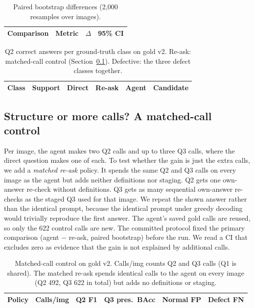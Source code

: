\documentclass[11pt]{article}
\begin{document}
\begin{table}[t]
\centering
\caption{Paired bootstrap differences (2,000 resamples over images).}
\label{tab:ci}
\begin{tabular}{llrr}
\toprule
Comparison & Metric & $\Delta$ & 95\% CI \\
\midrule

\bottomrule
\end{tabular}
\end{table}

\begin{table}[t]
\centering
\caption{Q2 correct answers per ground-truth class on gold v2. Re-ask: matched-call control (Section~\ref{sec:matched}). Defective: the three defect classes together.}
\label{tab:perdefect}
\begin{tabular}{lrrrrr}
\toprule
Class & Support & Direct & Re-ask & Agent & Candidate \\
\midrule

\bottomrule
\end{tabular}
\end{table}

\subsection{Structure or more calls? A matched-call control}\label{sec:matched}
Per image, the agent makes two Q2 calls and up to three Q3 calls, where the direct question makes one of each. To test whether the gain is just the extra calls, we add a \emph{matched re-ask} policy. It spends the same Q2 and Q3 calls on every image as the agent but adds neither definitions nor staging. Q2 gets one own-answer re-check without definitions. Q3 gets as many sequential own-answer re-checks as the staged Q3 used for that image. We repeat the shown answer rather than the identical prompt, because the identical prompt under greedy decoding would trivially reproduce the first answer. The agent's saved gold calls are reused, so only the 622 control calls are new. The committed protocol fixed the primary comparison (agent $-$ re-ask, paired bootstrap) before the run. We read a CI that excludes zero as evidence that the gain is not explained by additional calls.

\begin{table}[t]
\centering
\caption{Matched-call control on gold v2. Calls/img counts Q2 and Q3 calls (Q1 is shared). The matched re-ask spends identical calls to the agent on every image (Q2 492, Q3 622 in total) but adds no definitions or staging.}
\label{tab:matched}
\begin{tabular}{lrrrrr}
\toprule
Policy & Calls/img & Q2 F1 & Q3 pres.\ BAcc & Normal FP & Defect FN \\
\midrule

\bottomrule
\end{tabular}
\end{table}
\end{document}
